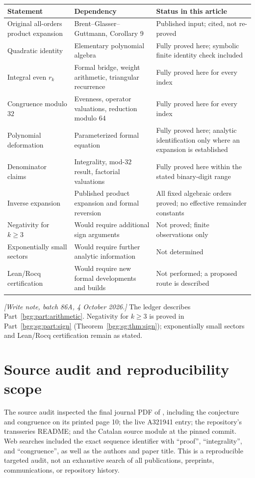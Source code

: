 \documentclass[11pt,a4paper]{article}
\numberwithin{equation}{section}
\theoremstyle{definition}
\theoremstyle{remark}
\theoremstyle{definition}
\begin{document}
\begin{longtable}{@{}p{}p{}p{}@{}}
\toprule
Statement & Dependency & Status in this article\\
\midrule
\endhead
Original all-orders product expansion & Brent--Glasser--Guttmann,
Corollary 9 & Published input; cited, not re-proved\\
Quadratic identity & Elementary polynomial algebra & Fully proved here;
symbolic finite identity check included\\
Integral even $r_k$ & Formal bridge, weight arithmetic, triangular recurrence &
Fully proved here for every index\\
Congruence modulo $32$ & Evenness, operator valuations, reduction modulo $64$ &
Fully proved here for every index\\
Polynomial deformation & Parameterized formal equation & Fully proved here;
analytic identification only where an expansion is established\\
Denominator claims & Integrality, mod-$32$ result, factorial valuations &
Fully proved here within the stated binary-digit range\\
Inverse expansion & Published product expansion and formal reversion &
All fixed algebraic orders proved; no effective remainder constants\\
Negativity for $k\ge3$ & Would require additional sign arguments &
Not proved; finite observations only\\
Exponentially small sectors & Would require further analytic information &
Not determined\\
Lean/Rocq certification & Would require new formal developments and builds &
Not performed; a proposed route is described\\
\bottomrule
\end{longtable}

\emph{[Write note, batch 86A, 4 October 2026.]} The ledger describes
Part~\ref{bgg:part:arithmetic}. Negativity for $k\ge3$ is proved in
Part~\ref{bgg:sg:part:sign} (Theorem~\ref{bgg:sg:thm:sign}); exponentially
small sectors and Lean/Rocq certification remain as stated.

\section{Source audit and reproducibility scope}
\label{bgg:app:audit}

The source audit inspected the final journal PDF of \cite{BGG}, including
the conjecture and congruence on its printed page 10; the live A321941 entry;
the repository's transseries README; and the Catalan source module at the
pinned commit. Web searches included the exact sequence identifier with
``proof'', ``integrality'', and ``congruence'', as well as the authors and
paper title. This is a reproducible targeted audit, not an exhaustive search
of all publications, preprints, communications, or repository history.
\end{document}
